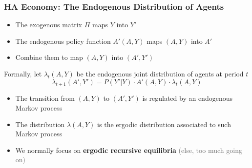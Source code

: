 \documentclass[10pt, aspectratio=1610, natbib, handout]{beamer}
\newcommand{\dimmer}[1]{\textcolor{dimgray}{#1}}
\begin{document}
  \begin{frame}
    \frametitle{HA Economy: The Endogenous Distribution of Agents}

    \begin{itemize}
      \item The exogenous matrix $\Pi$ maps $Y$ into $Y'$
      \item The endogenous policy function $A'(A, Y)$ maps $(A, Y)$ into $A'$
      \item Combine them to map $(A, Y)$ into $(A', Y')$
    \end{itemize}

    \vfill\pause

    Formally, let $\lambda_t(A, Y)$ be the endogenous joint distribution of agents at period $t$
    \begin{equation*}
      \lambda_{t+1}(A', Y') = P(Y' | Y) \cdot A'(A, Y) \cdot \lambda_t(A, Y)
    \end{equation*}

    \vfill\pause

    \begin{itemize}
      \item The transition from $(A, Y)$ to $(A', Y')$ is regulated by an endogenous Markov process
      \item The distribution $\lambda(A, Y)$ is the ergodic distribution associated to such Markov process
      \item We normally focus on \textbf{ergodic recursive equilibria} \hfill\dimmer{(else, too much going on)}
    \end{itemize}

  \end{frame}
\end{document}
